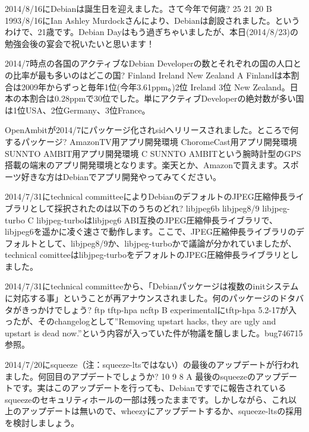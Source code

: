 %

\santaku
{2014/8/16にDebianは誕生日を迎えました。さて今年で何歳?}
{25}
{21}
{20}
{B}
{1993/8/16にIan Ashley Murdockさんにより、Debianは創設されました。というわけで、21歳です。Debian Dayはもう過ぎちゃいましたが、本日(2014/8/23)の勉強会後の宴会で祝いたいと思います！}

\santaku
{2014/7時点の各国のアクティブなDebian Developerの数とそれぞれの国の人口との比率が最も多いのはどこの国?}
{Finland}
{Ireland}
{New Zealand}
{A}
{Finlandは本割合は2009年からずっと毎年1位(今年3.61ppm。)2位 Ireland 3位 New Zealand。日本の本割合は0.28ppmで30位でした。単にアクティブDeveloperの絶対数が多い国は1位USA、2位Germany、3位France。}

\santaku
{OpenAmbitが2014/7にパッケージ化されsidへリリースされました。ところで何するパッケージ?}
{AmazonTV用アプリ開発環境}
{ChoromeCast用アプリ開発環境}
{SUNNTO AMBIT用アプリ開発環境}
{C}
{SUNNTO AMBITという腕時計型のGPS搭載の端末のアプリ開発環境となります。楽天とか、Amazonで買えます。スポーツ好きな方はDebianでアプリ開発やってみてください。}

\santaku
{2014/7/31にtechnical committeeによりDebianのデフォルトのJPEG圧縮伸長ライブラリとして採択されたのは以下のうちのどれ?}
{libjpeg6b}
{libjpeg8/9}
{libjpeg-turbo}
{C}
{libjpeg-turboはlibjpeg6 ABI互換のJPEG圧縮伸長ライブラリで、libjpeg6を遥かに凌ぐ速さで動作します。ここで、JPEG圧縮伸長ライブラリのデフォルトとして、libjpeg8/9か、libjpeg-turboかで議論が分かれていましたが、technical comitteeはlibjpeg-turboをデフォルトのJPEG圧縮伸長ライブラリとしました。}

\santaku
{2014/7/31にtechnical committeeから、「Debianパッケージは複数のinitシステムに対応する事」ということが再アナウンスされました。何のパッケージのドタバタがきっかけでしょう?}
{ftp}
{tftp-hpa}
{ncftp}
{B}
{experimentalにtftp-hpa 5.2-17が入ったが、そのchangelogとして''Removing upstart hacks, they are ugly and upstart is dead now.''という内容が入っていた件が物議を醸しました。bug746715参照。}

\santaku
{2014/7/20にsqueeze（注：squeeze-ltsではない）の最後のアップデートが行われました。何回目のアプデートでしょうか?}
{10}
{9}
{8}
{A}
{最後のsqueezeのアップデートです。実はこのアップデートを行っても、Debianですでに報告されているsqueezeのセキュリティホールの一部は残ったままです。しかしながら、これ以上のアップデートは無いので、wheezyにアップデートするか、squeeze-ltsの採用を検討しましょう。}

